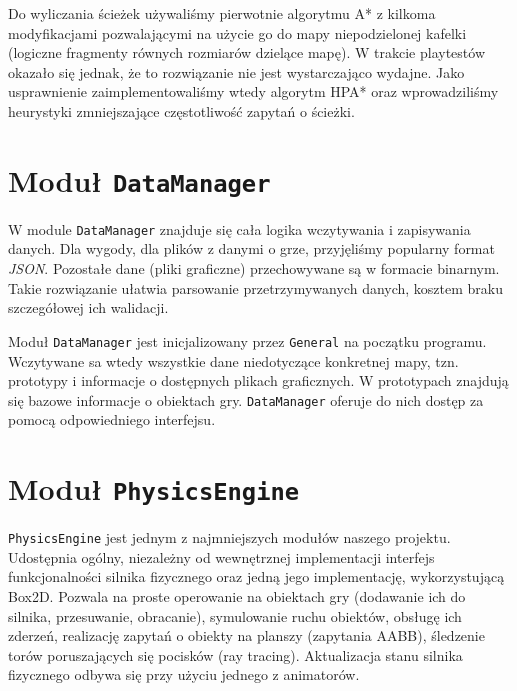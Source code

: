 \documentclass[licencjacka]{pracamgr}
\begin{document}
      Do wyliczania ścieżek używaliśmy pierwotnie algorytmu A*\cite{A*} z kilkoma modyfikacjami pozwalającymi na użycie go do mapy
      niepodzielonej kafelki (logiczne fragmenty równych rozmiarów dzielące mapę). W trakcie playtestów okazało się jednak, że to
      rozwiązanie nie jest wystarczająco wydajne. Jako usprawnienie zaimplementowaliśmy wtedy algorytm HPA*\cite{HPA} oraz wprowadziliśmy
      heurystyki zmniejszające częstotliwość zapytań o ścieżki.


  \section{Moduł \texttt{DataManager}}
    W module \texttt{DataManager} znajduje się cała logika wczytywania i zapisywania danych. Dla wygody, dla plików z
    danymi o grze, przyjęliśmy popularny format \emph{JSON}. Pozostałe dane (pliki graficzne) przechowywane są w formacie
    binarnym. Takie rozwiązanie ułatwia parsowanie przetrzymywanych danych, kosztem braku szczegółowej ich walidacji.

    Moduł \texttt{DataManager} jest inicjalizowany przez \texttt{General} na początku programu. Wczytywane sa wtedy wszystkie dane
    niedotyczące konkretnej mapy, tzn. prototypy i informacje o dostępnych plikach graficznych. W prototypach znajdują się 
    bazowe informacje o obiektach gry. \texttt{DataManager} oferuje do nich dostęp za pomocą odpowiedniego interfejsu.

  \section{Moduł \texttt{PhysicsEngine}}
    \texttt{PhysicsEngine} jest jednym z najmniejszych modułów naszego projektu. Udostępnia ogólny, niezależny od
    wewnętrznej implementacji interfejs funkcjonalności silnika fizycznego oraz jedną jego implementację, wykorzystującą Box2D.
    Pozwala na proste operowanie na obiektach gry (dodawanie ich do silnika, przesuwanie, obracanie), symulowanie ruchu obiektów,
    obsługę ich zderzeń, realizację zapytań o obiekty na planszy (zapytania AABB), śledzenie torów poruszających się pocisków (ray tracing).
    Aktualizacja stanu silnika fizycznego odbywa się przy użyciu jednego z animatorów.
\end{document}
